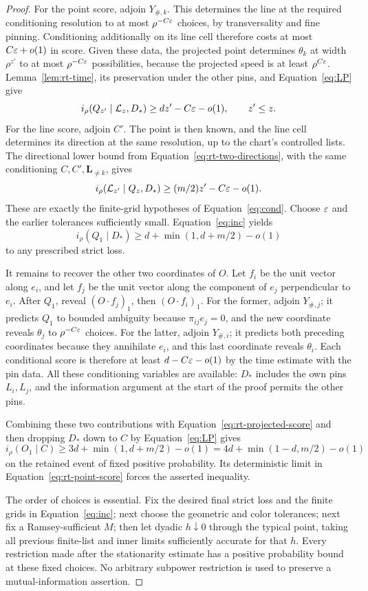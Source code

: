 \begin{proof}
For the point score, adjoin $Y_{\#,k}$.  This determines the
line at the required conditioning resolution to at most
$\rho^{-C\varepsilon}$ choices, by transversality and fine pinning.
Conditioning additionally on its line cell therefore costs at
most $C\varepsilon+o(1)$ in score.  Given these data, the projected
point determines $\theta_k$ at width $\rho^{z'}$ to at most
$\rho^{-C\varepsilon}$ possibilities, because the projected speed is
at least $\rho^{C\varepsilon}$.  Lemma~\ref{lem:rt-time}, its
preservation under the other pins, and Equation~\eqref{eq:LP}
give
\[
 i_\rho(Q_{z'}\mid\mathcal L_z,D_*)
                 \ge dz'-C\varepsilon-o(1),\qquad z'\le z.
\]
For the line score, adjoin $C'$.  The point is then known, and
the line cell determines its direction at the same resolution,
up to the chart's controlled lists.  The directional lower bound
from Equation~\eqref{eq:rt-two-directions}, with the same
conditioning $C,C',\mathbf L_{\ne k}$, gives
\[
 i_\rho(\mathcal L_{z'}\mid Q_z,D_*)
                 \ge (m/2)z'-C\varepsilon-o(1).
\]
These are exactly the finite-grid hypotheses of
Equation~\eqref{eq:cond}.  Choose $\varepsilon$ and the earlier
tolerances sufficiently small.  Equation~\eqref{eq:inc} yields
\begin{equation}\label{eq:rt-projected-score}
 i_\rho(Q_1\mid D_*)
                 \ge d+\min(1,d+m/2)-o(1)
\end{equation}
to any prescribed strict loss.

It remains to recover the other two coordinates of $O$.  Let
$f_i$ be the unit vector along $e_i$, and let $f_j$ be the unit
vector along the component of $e_j$ perpendicular to $e_i$.
After $Q_1$, reveal $(O\cdot f_j)_1$, then
$(O\cdot f_i)_1$.  For the former, adjoin $Y_{\#,j}$; it
predicts $Q_1$ to bounded ambiguity because $\pi_{ij}e_j=0$,
and the new coordinate reveals $\theta_j$ to
$\rho^{-C\varepsilon}$ choices.  For the latter, adjoin
$Y_{\#,i}$; it predicts both preceding coordinates because
they annihilate $e_i$, and this last coordinate reveals
$\theta_i$.  Each conditional score is therefore at least
$d-C\varepsilon-o(1)$ by the time estimate with the pin data.
All these conditioning variables are available: $D_*$ includes
the own pins $L_i,L_j$, and the information argument at the
start of the proof permits the other pins.

Combining these two contributions with
Equation~\eqref{eq:rt-projected-score} and then dropping $D_*$
down to $C$ by Equation~\eqref{eq:LP} gives
\[
 i_\rho(O_1\mid C)
 \ge3d+\min(1,d+m/2)-o(1)
 =4d+\min(1-d,m/2)-o(1)
\]
on the retained event of fixed positive probability.
Its deterministic limit in Equation~\eqref{eq:rt-point-score}
forces the asserted inequality.

The order of choices is essential.  Fix the desired final strict
loss and the finite grids in Equation~\eqref{eq:inc}; next choose
the geometric and color tolerances; next fix a Ramsey-sufficient
$M$; then let dyadic $h\downarrow0$ through the typical point,
taking all previous finite-list and inner limits sufficiently
accurate for that $h$.  Every restriction made after the
stationarity estimate has a positive probability bound at these
fixed choices.  No arbitrary subpower restriction is used to
preserve a mutual-information assertion.
\end{proof}

